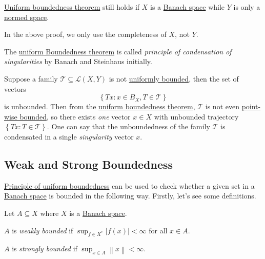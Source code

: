 \begin{remark}[Completeness]
	\hyperref[thm:uniform-boundedness]{Uniform boundedness theorem} still holds if \(X\) is a \hyperref[def:Banach-space]{Banach space} while \(Y\) is only a \hyperref[def:normed-vector-space]{normed space}.
\end{remark}
\begin{explanation}
	In the above proof, we only use the completeness of \(X\), not \(Y\).
\end{explanation}

\begin{note}
	The \hyperref[thm:uniform-boundedness]{uniform Boundedness theorem} is called \emph{principle of condensation of singularities} by Banach and Steinhaus initially.
\end{note}
\begin{explanation}
	Suppose a family \(\mathcal{T} \subseteq \mathcal{L} (X, Y)\) is not \hyperref[def:uniformly-bounded]{uniformly bounded}, then the set of vectors
	\[
		\left\{ Tx\colon x\in B_X, T\in \mathcal{T}  \right\}
	\]
	is unbounded. Then from the \hyperref[thm:uniform-boundedness]{uniform boundedness theorem}, \(\mathcal{T} \) is not even \hyperref[def:point-wise-bounded]{point-wise bounded}, so there exists \emph{one} vector \(x\in X\) with unbounded trajectory \(\left\{ Tx\colon T\in \mathcal{T}  \right\} \). One can say that the unboundedness of the family \(\mathcal{T} \) is condensated in a single \emph{singularity} vector \(x\).
\end{explanation}

\subsection{Weak and Strong Boundedness}
\hyperref[thm:uniform-boundedness]{Principle of uniform boundedness} can be used to check whether a given set in a \hyperref[def:Banach-space]{Banach space} is bounded in the following way. Firstly, let's see some definitions.

\begin{definition*}
	Let \(A \subseteq X\) where \(X\) is a \hyperref[def:Banach-space]{Banach space}.
	\begin{definition}\label{def:weakly-bounded}
		\(A\) is \emph{weakly bounded} if \(\sup _{f\in X^{\ast} }\left\vert f(x) \right\vert < \infty\) for all \(x\in A\).
	\end{definition}
	\begin{definition}\label{def:strongly-bounded}
		\(A\) is \emph{strongly bounded} if \(\sup _{x\in A}\left\lVert x\right\rVert < \infty\).
	\end{definition}
\end{definition*}

